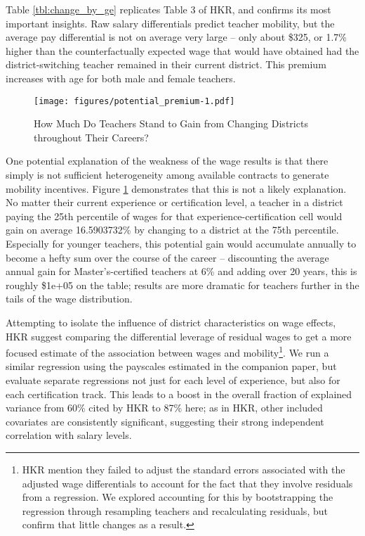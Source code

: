 \documentclass[12pt,]{article}
\let\rmarkdownfootnote\footnote%
\def\footnote{\protect\rmarkdownfootnote}
\begin{document}
Table \ref{tbl:change_by_ge} replicates Table 3 of HKR, and confirms its
most important insights. Raw salary differentials predict teacher
mobility, but the average pay differential is not on average very large
-- only about \$325, or 1.7\% higher than the counterfactually expected
wage that would have obtained had the district-switching teacher
remained in their current district. This premium increases with age for
both male and female teachers.

\begin{figure}[htbp]
\centering
\texttt{[image: figures/potential\_premium-1.pdf]}
\caption{\label{fig:premia}How Much Do Teachers Stand to Gain from
Changing Districts throughout Their Careers?}
\end{figure}

One potential explanation of the weakness of the wage results is that
there simply is not sufficient heterogeneity among available contracts
to generate mobility incentives. Figure \ref{fig:premia} demonstrates
that this is not a likely explanation. No matter their current
experience or certification level, a teacher in a district paying the
25th percentile of wages for that experience-certification cell would
gain on average 16.5903732\% by changing to a district at the 75th
percentile. Especially for younger teachers, this potential gain would
accumulate annually to become a hefty sum over the course of the career
-- discounting the average annual gain for Master's-certified teachers
at 6\% and adding over 20 years, this is roughly \$1e+05 on the table;
results are more dramatic for teachers further in the tails of the wage
distribution.

Attempting to isolate the influence of district characteristics on wage
effects, HKR suggest comparing the differential leverage of residual
wages to get a more focused estimate of the association between wages
and mobility\footnote{HKR mention they failed to adjust the standard
  errors associated with the adjusted wage differentials to account for
  the fact that they involve residuals from a regression. We explored
  accounting for this by bootstrapping the regression through resampling
  teachers and recalculating residuals, but confirm that little changes
  as a result.}. We run a similar regression using the payscales
estimated in the companion paper, but evaluate separate regressions not
just for each level of experience, but also for each certification
track. This leads to a boost in the overall fraction of explained
variance from 60\% cited by HKR to 87\% here; as in HKR, other included
covariates are consistently significant, suggesting their strong
independent correlation with salary levels.
\end{document}
